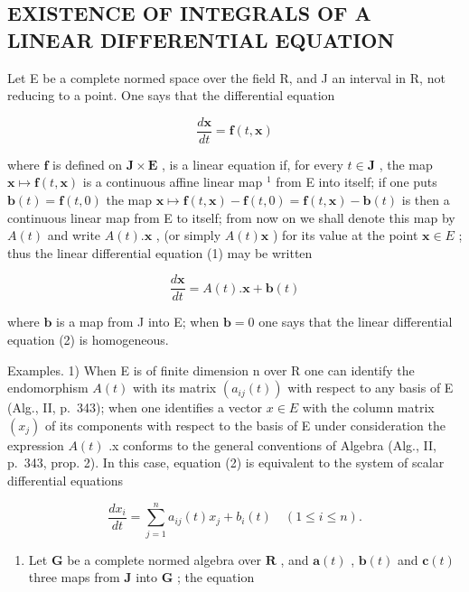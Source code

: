 \subsection{EXISTENCE OF INTEGRALS OF A LINEAR DIFFERENTIAL EQUATION}

Let E be a complete normed space over the field R, and J an interval in R, not reducing to a point. One says that the differential equation

\[
{\frac {d \mathbf {x}}{d t}} = \mathbf {f} (t, \mathbf {x})\tag{1}
\]

where \(\mathbf{f}\) is defined on \(\mathbf{J} \times \mathbf{E}\) , is a linear equation if, for every \(t \in \mathbf{J}\) , the map \(\mathbf{x} \mapsto \mathbf{f}(t, \mathbf{x})\) is a continuous affine linear map \(^1\) from E into itself; if one puts \(\mathbf{b}(t) = \mathbf{f}(t, 0)\) the map \(\mathbf{x} \mapsto \mathbf{f}(t, \mathbf{x}) - \mathbf{f}(t, 0) = \mathbf{f}(t, \mathbf{x}) - \mathbf{b}(t)\) is then a continuous linear map from E to itself; from now on we shall denote this map by \(A(t)\) and write \(A(t).\mathbf{x}\) , (or simply \(A(t)\mathbf{x}\) ) for its value at the point \(\mathbf{x} \in E\) ; thus the linear differential equation (1) may be written

\[
{\frac {d \mathbf {x}}{d t}} = A (t). \mathbf {x} + \mathbf {b} (t)\tag{2}
\]

where \(\mathbf{b}\) is a map from J into E; when \(\mathbf{b} = 0\) one says that the linear differential equation (2) is homogeneous.

Examples. 1) When E is of finite dimension n over R one can identify the endomorphism \(A(t)\) with its matrix \(\left(a_{ij}(t)\right)\) with respect to any basis of E (Alg., II, p.~343); when one identifies a vector \(x \in E\) with the column matrix \(\left(x_{j}\right)\) of its components with respect to the basis of E under consideration the expression \(A(t)\) .x conforms to the general conventions of Algebra (Alg., II, p.~343, prop. 2). In this case, equation (2) is equivalent to the system of scalar differential equations

\[
\frac {d x _ {i}}{d t} = \sum_ {j = 1} ^ {n} a _ {i j} (t) x _ {j} + b _ {i} (t) \quad (1 \leqslant i \leqslant n).\tag{3}
\]

\begin{enumerate}
\def\labelenumi{\arabic{enumi})}
\setcounter{enumi}{1}
\tightlist
\item
  Let \(\mathbf{G}\) be a complete normed algebra over \(\mathbf{R}\) , and \(\mathbf{a}(t)\) , \(\mathbf{b}(t)\) and \(\mathbf{c}(t)\) three maps from \(\mathbf{J}\) into \(\mathbf{G}\) ; the equation
\end{enumerate}

